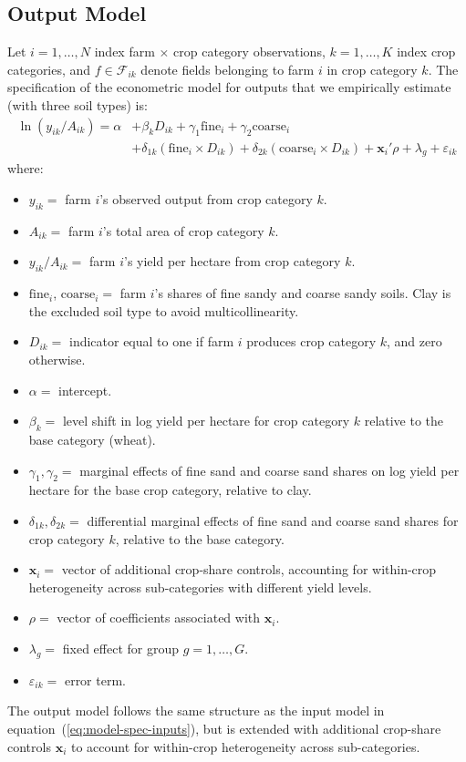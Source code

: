 \documentclass{scrartcl}
\begin{document}
\subsection*{Output Model}
Let $i = 1, \ldots, N$ index farm $\times$ crop category observations, $k = 1, \ldots, K$ index crop categories, and $f \in \mathcal{F}_{ik}$ denote fields belonging to farm $i$ in crop category $k$.
The specification of the econometric model for outputs that we empirically estimate (with three soil types) is:
\begin{equation}
\begin{aligned}
    \ln(y_{ik}/A_{ik}) = \alpha & + \beta_k D_{ik} + \gamma_1 \text{fine}_i + \gamma_2 \text{coarse}_i \\
    & + \delta_{1k}(\text{fine}_i \times D_{ik}) + \delta_{2k}(\text{coarse}_i \times D_{ik}) + \mathbf{x}_i'\rho + \lambda_g + \varepsilon_{ik}
    \label{eq:model-spec-outputs}
\end{aligned}
\end{equation}
where:
\begin{itemize}
    \item $y_{ik} =$ farm $i$'s observed output from crop category $k$.
    \item $A_{ik} =$ farm $i$'s total area of crop category $k$.
    \item $y_{ik}/A_{ik} =$ farm $i$'s yield per hectare from crop category $k$.
    \item $\text{fine}_i$, $\text{coarse}_i =$ farm $i$'s shares of fine sandy and coarse sandy soils.
    Clay is the excluded soil type to avoid multicollinearity.
    \item $D_{ik} =$ indicator equal to one if farm $i$ produces crop category $k$, and zero otherwise.
    \item $\alpha =$ intercept.
    \item $\beta_k =$ level shift in log yield per hectare for crop category $k$ relative to the base category (wheat).
    \item $\gamma_1, \gamma_2 =$ marginal effects of fine sand and coarse sand shares on log yield per hectare for the base crop category, relative to clay.
    \item $\delta_{1k}, \delta_{2k} =$ differential marginal effects of fine sand and coarse sand shares for crop category $k$, relative to the base category.
    \item $\mathbf{x}_i =$ vector of additional crop-share controls, accounting for within-crop heterogeneity across sub-categories with different yield levels.
    \item $\rho =$ vector of coefficients associated with $\mathbf{x}_i$.
    \item $\lambda_g =$ fixed effect for group $g = 1, \ldots, G$.
    \item $\varepsilon_{ik} =$ error term.
\end{itemize}
The output model follows the same structure as the input model in equation~(\ref{eq:model-spec-inputs}), but is extended with additional crop-share controls $\mathbf{x}_i$ to account for within-crop heterogeneity across sub-categories.
\end{document}

